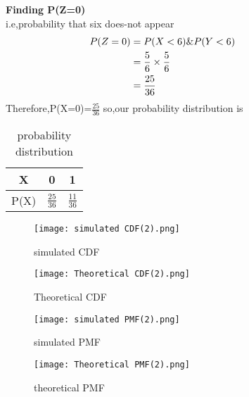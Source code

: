 \documentclass[11pt,a4paper,twocolumn]{article}
\begin{document}
\textbf{Finding P(Z=0)}
\\i.e,probability that six does-not appear
\begin{align*}
\hspace{-3cm}
    P(Z=0)&=P(X<6)\&P(Y<6)\\
    &=\frac{5}{6}\times\frac{5}{6}\\
    &=\frac{25}{36}
\end{align*}
Therefore,P(X=0)=$\frac{25}{36}$
so,our probability distribution is
\begin{table}[ht]
    \centering
    \begin{tabular}{|c|c|c|}
    \hline
         X&0&1\\[5pt]
         \hline
         P(X)&$\frac{25}{36}$&$\frac{11}{36}$\\[5pt]
         \hline
    \end{tabular}
    \caption{probability distribution}
    \label{tab:my_label}
\end{table}
\begin{figure}[h!]
    \centering
    \texttt{[image: simulated CDF(2).png]}
    \caption{simulated CDF}
\end{figure}
\begin{figure}[h!]
    \centering
    \texttt{[image: Theoretical CDF(2).png]} 
    \caption{Theoretical CDF}
\end{figure}
\begin{figure}[h!]
    \centering
    \texttt{[image: simulated PMF(2).png]} 
    \caption{simulated PMF}
\end{figure}
\begin{figure}[h!]
    \centering
    \texttt{[image: Theoretical PMF(2).png]}
    \caption{theoretical PMF}
\end{figure}
\end{document}
